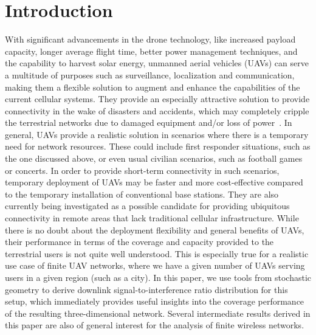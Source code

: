 \documentclass[journal,draftclsnofoot,onecolumn,12pt]{IEEEtran}
\begin{document}
\section{Introduction} \label{sec:intro}

With significant advancements in the drone technology, like increased payload capacity, longer average flight time, better power management techniques, and the capability to harvest solar energy, unmanned aerial vehicles (UAVs) can serve a multitude of purposes such as surveillance, localization and communication, making them a flexible solution to augment and enhance the capabilities of the current cellular systems. They provide an especially attractive solution to provide connectivity in the wake of disasters and accidents, which may completely cripple the terrestrial networks due to damaged equipment and/or loss of power~\cite{uav_safety,gen1}. In general, UAVs provide a realistic solution in scenarios where there is a temporary need for network resources. These could include first responder situations, such as the one discussed above, or even usual civilian scenarios, such as football games or concerts. In order to provide short-term connectivity in such scenarios, temporary deployment of UAVs may be faster and more cost-effective compared to the temporary installation of conventional base stations. They are also currently being investigated as a possible candidate for providing ubiquitous connectivity in remote areas that lack traditional cellular infrastructure. While there is no doubt about the deployment flexibility and general benefits of UAVs, their performance in terms of the coverage and capacity provided to the terrestrial users is not quite well understood. This is especially true for a realistic use case of finite UAV networks, where we have a given number of UAVs serving users in a given region (such as a city). In this paper, we use tools from stochastic geometry to derive downlink signal-to-interference ratio distribution for this setup, which immediately provides useful insights into the coverage performance of the resulting three-dimensional network. Several intermediate results derived in this paper are also of general interest for the analysis of finite wireless networks. 
\end{document}
